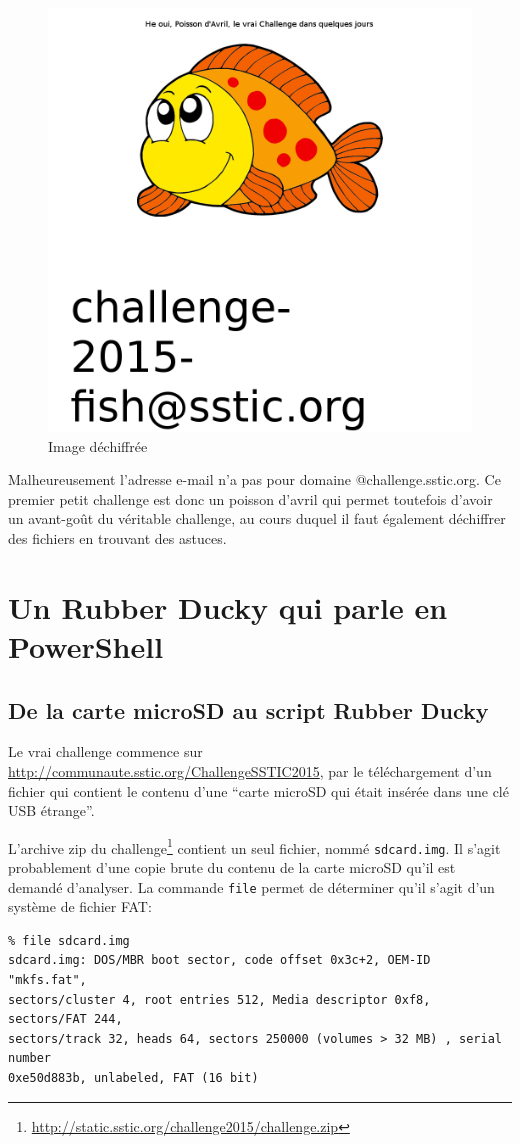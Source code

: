 \documentclass[a4paper,10pt]{article}
\begin{document}
\begin{figure}[h]
  \centering
  \includegraphics[width=12cm]{stage0/pngsolution.png}
  \caption{Image déchiffrée}
\end{figure}

Malheureusement l'adresse e-mail n'a pas pour domaine @challenge.sstic.org.
Ce premier petit challenge est donc un poisson d'avril qui permet toutefois d'avoir un avant-goût du véritable challenge, au cours duquel il faut également déchiffrer des fichiers en trouvant des astuces.

\clearpage
\section{Un Rubber Ducky qui parle en PowerShell}

\subsection{De la carte microSD au script Rubber Ducky}

Le vrai challenge commence sur \url{http://communaute.sstic.org/ChallengeSSTIC2015}, par le téléchargement d'un fichier qui contient le contenu d'une ``carte microSD qui était insérée dans une clé USB étrange''.

L'archive zip du challenge\footnote{\url{http://static.sstic.org/challenge2015/challenge.zip}} contient un seul fichier, nommé \texttt{sdcard.img}.
Il s'agit probablement d'une copie brute du contenu de la carte microSD qu'il est demandé d'analyser. La commande \texttt{file} permet de déterminer qu'il s'agit d'un système de fichier FAT:
\begin{verbatim}
% file sdcard.img
sdcard.img: DOS/MBR boot sector, code offset 0x3c+2, OEM-ID "mkfs.fat",
sectors/cluster 4, root entries 512, Media descriptor 0xf8, sectors/FAT 244,
sectors/track 32, heads 64, sectors 250000 (volumes > 32 MB) , serial number
0xe50d883b, unlabeled, FAT (16 bit)
\end{verbatim}
\end{document}
